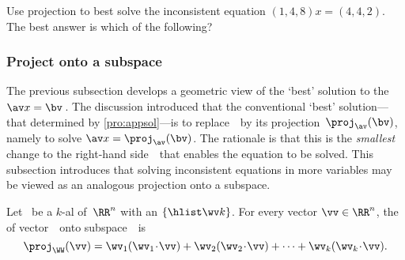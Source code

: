 \begin{activity}
Use projection to best solve the inconsistent equation \((1,4,8)x=(4,4,2)\). 
The best answer is which of the following?
\end{activity}











\subsubsection{Project onto a subspace}

The previous subsection develops a geometric view of the `best' solution to the  \(\av x=\bv\)\,.
The discussion introduced that the conventional `best' solution---that determined by \autoref{pro:appsol}---is to replace~\bv\ by its projection~\(\proj_{\av}(\bv)\), namely to solve \(\av x=\proj_{\av}(\bv)\).
The rationale is that this is the \emph{smallest} change to the right-hand side~\bv\ that enables the equation to be solved.  
This subsection introduces that solving inconsistent equations in more variables may be viewed as an analogous projection onto a subspace.



\begin{definition} \label{def:orthproj}
Let \WW\ be a \(k\)-al  of~\(\RR^n\) with an  \(\{\hlist\wv k\}\).
For every vector \(\vv\in\RR^n\), the  of vector~\vv\ onto subspace~\WW\ is
\begin{equation*}
\proj_\WW(\vv)=\wv_1(\wv_1\cdot\vv)+\wv_2(\wv_2\cdot\vv)+\cdots+\wv_k(\wv_k\cdot\vv).
\end{equation*}
\end{definition}

